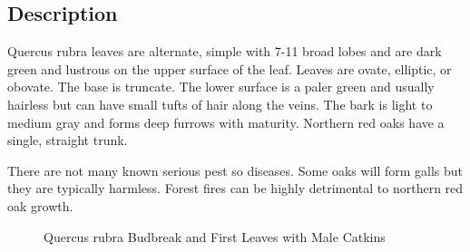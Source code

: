 \documentclass{article}\usepackage[]{graphicx}\usepackage[]{color}
\begin{document}
\subsection*{Description}
Quercus rubra leaves are alternate, simple with 7-11 broad lobes and are dark green and lustrous on the upper surface of the leaf. Leaves are ovate, elliptic, or obovate. The base is truncate. The lower surface is a paler green and usually hairless but can have small tufts of hair along the veins. The bark is light to medium gray and forms deep furrows with maturity. Northern red oaks have a single, straight trunk. 

There are not many known serious pest so diseases. Some oaks will form galls but they are typically harmless. Forest fires can be highly detrimental to northern red oak growth.  
\begin{figure}[ht]%
    \centering
    \qquad
    \caption{Quercus rubra Budbreak and First Leaves with Male Catkins}%
    \label{fig:leaves}%
\end{figure}
\newpage
\end{document}
